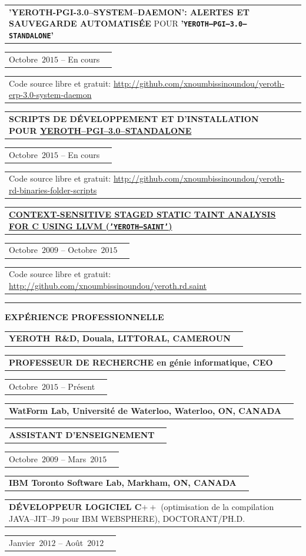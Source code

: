 \documentclass[9pt,a4paper]{article} %
\makeatletter
\newcommand{\yerothrd}{YEROTH~R\&D\xspace}
\newcommand{\headerrow}[2]
{\begin{tabular*}{\linewidth}{l@{\extracolsep{\fill}}r}
	#1 &
	#2 \\
\end{tabular*}}
\newcommand{\headerrowONE}[1]{\headerrow{#1}{}}
\newcommand{\cplusplus}{C$++$\xspace}
\newcommand{\cvitemdate}[2]{#1~$#2$\xspace}
\newcommand{\cvitempositionheld}[1]{\textbf{#1}\xspace}
\makeatother
\begin{document}
\vspace{0.3em}

\headerrowONE{\textbf{'YEROTH-PGI-3.0--SYSTEM--DAEMON': ALERTES ET SAUVEGARDE AUTOMATISÉE}
  POUR \textbf{'\texttt{YEROTH--PGI--3.0--STANDALONE}'}}
  \headerrowONE{\cvitemdate{Octobre}{2015} -- En cours}
\headerrowONE{Code source libre et gratuit: \url{http://github.com/xnoumbissinoundou/yeroth-erp-3.0-system-daemon}}

\vspace{0.3em}

\headerrowONE{\textbf{SCRIPTS DE DÉVELOPPEMENT ET D'INSTALLATION
  POUR 
  \href{http://github.com/xnoumbissinoundou/yeroth-erp-3.0}{\textbf{YEROTH--PGI--3.0--STANDALONE}}}}
  \headerrowONE{\cvitemdate{Octobre}{2015} -- En cours}
\headerrowONE{Code source libre et gratuit: \url{http://github.com/xnoumbissinoundou/yeroth-rd-binaries-folder-scripts}}

\vspace{0.3em}

\headerrowONE{\href{http://archive.org/download/yeroth-saint/YEROTH-SAINT.PDF}{\textbf{CONTEXT-SENSITIVE STAGED STATIC TAINT ANALYSIS FOR C USING LLVM (\texttt{'YEROTH--SAINT'})}}}
\headerrowONE{\cvitemdate{Octobre}{2009} -- \cvitemdate{Octobre}{2015}}
\headerrowONE{Code source libre et gratuit: \url{http://github.com/xnoumbissinoundou/yeroth.rd.saint}}
	
	
\vspace{1em}


\hrule
\begin{center}
{\large \textbf{EXPÉRIENCE PROFESSIONNELLE}}
\end{center}

\vspace{0.5em}

\headerrowONE{\textbf{\yerothrd, Douala, LITTORAL, CAMEROUN}}
\headerrowONE{\cvitempositionheld{PROFESSEUR DE RECHERCHE en génie informatique, CEO}}
\headerrowONE{\cvitemdate{Octobre}{2015} -- Présent}	

\vspace{0.3em}

\headerrowONE{\textbf{WatForm Lab, Université de Waterloo, Waterloo, ON, CANADA}}	
\headerrowONE{\cvitempositionheld{ASSISTANT D'ENSEIGNEMENT}}
\headerrowONE{\cvitemdate{Octobre}{2009} -- \cvitemdate{Mars}{2015}}
	
\vspace{0.3em}

\headerrowONE{\textbf{IBM Toronto Software Lab, Markham, ON, CANADA}}	
\headerrowONE{\cvitempositionheld{DÉVELOPPEUR LOGICIEL \cplusplus} (optimisation de la compilation JAVA--JIT--J$9$
	pour IBM WEBSPHERE), DOCTORANT/PH.D.}
\headerrowONE{\cvitemdate{Janvier}{2012} -- \cvitemdate{Août}{2012}}	
\end{document}
